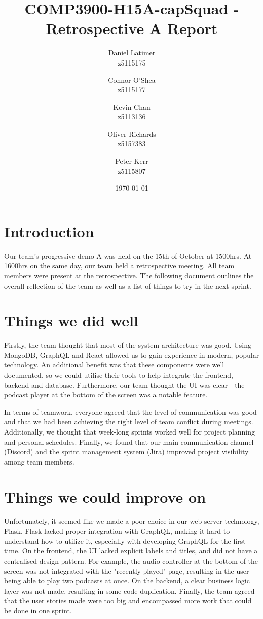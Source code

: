 \documentclass[12pt]{article}
\title{COMP3900-H15A-capSquad - Retrospective A Report}
\date{\today}
\author{
    Daniel Latimer \\ z5115175 \and
    Connor O'Shea \\ z5115177 \and
    Kevin Chan \\ z5113136 \and
    Oliver Richards \\ z5157383 \and
    Peter Kerr \\ z5115807}
\begin{document}
\maketitle
\tableofcontents
\newpage

\section{Introduction}

Our team's progressive demo A was held on the 15th of October at 1500hrs.
At 1600hrs on the same day, our team held a retrospective meeting.
All team members were present at the retrospective.
The following document outlines the overall reflection of the team as well as a list of things to try in the next sprint.

\section{Things we did well}

Firstly, the team thought that most of the system architecture was good.
Using MongoDB, GraphQL and React allowed us to gain experience in modern, popular technology.
An additional benefit was that these components were well documented, so we could utilise their tools to help integrate the frontend, backend and database.
Furthermore, our team thought the UI was clear - the podcast player at the bottom of the screen was a notable feature.

In terms of teamwork, everyone agreed that the level of communication was good and that we had been achieving the right level of team conflict during meetings.
Additionally, we thought that week-long sprints worked well for project planning and personal schedules.
Finally, we found that our main communication channel (Discord) and the sprint management system (Jira) improved project visibility among team members.

\section{Things we could improve on}

Unfortunately, it seemed like we made a poor choice in our web-server technology, Flask.
Flask lacked proper integration with GraphQL, making it hard to understand how to utilize it, especially with developing GraphQL for the first time.
On the frontend, the UI lacked explicit labels and titles, and did not have a centralised design pattern.
For example, the audio controller at the bottom of the screen was not integrated with the "recently played" page, resulting in the user being able to play two podcasts at once.
On the backend, a clear business logic layer was not made, resulting in some code duplication.
Finally, the team agreed that the user stories made were too big and encompassed more work that could be done in one sprint.
\end{document}
